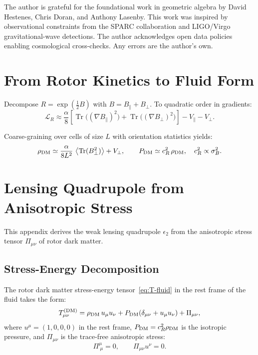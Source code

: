 \documentclass[11pt,a4paper]{article}
\numberwithin{equation}{section}
\theoremstyle{plain}
\theoremstyle{definition}
\theoremstyle{remark}
\DeclareMathOperator{\Tr}{Tr}
\newcommand{\avg}[1]{\left\langle #1 \right\rangle}
\newcommand{\Lag}{\mathcal{L}}              %
\begin{document}
The author is grateful for the foundational work in geometric algebra by David Hestenes, Chris Doran, and Anthony Lasenby. This work was inspired by observational constraints from the SPARC collaboration and LIGO/Virgo gravitational-wave detections. The author acknowledges open data policies enabling cosmological cross-checks. Any errors are the author's own.

\vspace{1em}

\appendix

\section{From Rotor Kinetics to Fluid Form}\label{app:fluid}

Decompose $R=\exp(\tfrac12 B)$ with $B=B_\parallel+B_\perp$. To quadratic order in gradients:
\begin{equation}
\Lag_R \approx \frac{\alpha}{8}\left[\Tr\big((\nabla B_\parallel)^2\big)+\Tr\big((\nabla B_\perp)^2\big)\right]-V_\parallel - V_\perp.
\end{equation}

Coarse-graining over cells of size $L$ with orientation statistics yields:
\begin{equation}
\rho_{\rm DM} \simeq \frac{\alpha}{8L^2}\,\avg{\Tr(B_\perp^2)} + V_\perp,
\qquad
P_{\rm DM}\simeq c_R^2\,\rho_{\rm DM},\quad c_R^2\propto \sigma_B^2.
\end{equation}

\section{Lensing Quadrupole from Anisotropic Stress}\label{app:lensing}

This appendix derives the weak lensing quadrupole $\epsilon_2$ from the anisotropic stress tensor $\Pi_{\mu\nu}$ of rotor dark matter.

\subsection{Stress-Energy Decomposition}

The rotor dark matter stress-energy tensor~\eqref{eq:T-fluid} in the rest frame of the fluid takes the form:
\begin{equation}
T^{(\rm DM)}_{\mu\nu} = \rho_{\rm DM}\,u_\mu u_\nu + P_{\rm DM}(\delta_{\mu\nu} + u_\mu u_\nu) + \Pi_{\mu\nu},
\end{equation}
where $u^\mu = (1,0,0,0)$ in the rest frame, $P_{\rm DM} = c_R^2 \rho_{\rm DM}$ is the isotropic pressure, and $\Pi_{\mu\nu}$ is the trace-free anisotropic stress:
\begin{equation}
\Pi^\mu_{\ \mu} = 0, \qquad \Pi_{\mu\nu}u^\nu = 0.
\end{equation}
\end{document}

